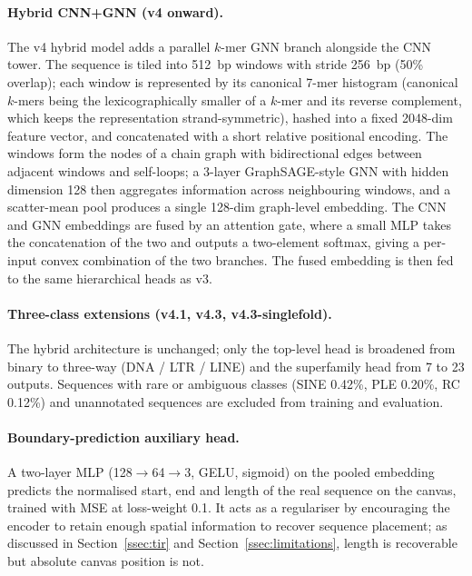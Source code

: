 \documentclass[12pt]{article}
\begin{document}
\paragraph{Hybrid CNN+GNN (v4 onward).} The v4 hybrid model adds a parallel $k$-mer GNN branch alongside the CNN tower. The sequence is tiled into 512~bp windows with stride 256~bp (50\% overlap); each window is represented by its canonical 7-mer histogram (canonical $k$-mers being the lexicographically smaller of a $k$-mer and its reverse complement, which keeps the representation strand-symmetric), hashed into a fixed 2048-dim feature vector, and concatenated with a short relative positional encoding. The windows form the nodes of a chain graph with bidirectional edges between adjacent windows and self-loops; a 3-layer GraphSAGE-style \cite{hamilton2017inductive} GNN with hidden dimension 128 then aggregates information across neighbouring windows, and a scatter-mean pool produces a single 128-dim graph-level embedding. The CNN and GNN embeddings are fused by an attention gate, where a small MLP takes the concatenation of the two and outputs a two-element softmax, giving a per-input convex combination of the two branches. The fused embedding is then fed to the same hierarchical heads as v3.

\paragraph{Three-class extensions (v4.1, v4.3, v4.3-singlefold).} The hybrid architecture is unchanged; only the top-level head is broadened from binary to three-way (DNA / LTR / LINE) and the superfamily head from 7 to 23 outputs. Sequences with rare or ambiguous classes (SINE 0.42\%, PLE 0.20\%, RC 0.12\%) and unannotated sequences are excluded from training and evaluation. 

\paragraph{Boundary-prediction auxiliary head.} A two-layer MLP (128$\to$64$\to$3, GELU, sigmoid) on the pooled embedding predicts the normalised start, end and length of the real sequence on the canvas, trained with MSE at loss-weight 0.1. It acts as a regulariser by encouraging the encoder to retain enough spatial information to recover sequence placement; as discussed in Section~\ref{ssec:tir} and Section~\ref{ssec:limitations}, length is recoverable but absolute canvas position is not.
\end{document}

